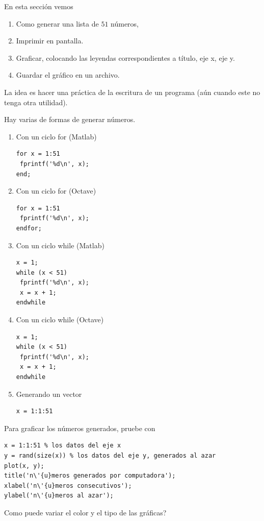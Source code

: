 En esta secci\'{o}n vemos 
\begin{enumerate}
\item Como generar una lista de $51$ n\'{u}meros,
\item Imprimir en pantalla.
\item Graficar, colocando las leyendas correspondientes a título, 
      eje x, eje y.
\item Guardar el gráfico en un archivo.
\end{enumerate}
La idea es hacer una pr\'{a}ctica de la escritura de un programa (a\'{u}n cuando este no tenga otra utilidad).

Hay varias de formas de generar n\'{u}meros.
\begin{enumerate}
\item Con un ciclo for (Matlab)
\begin{verbatim}
for x = 1:51
 fprintf('%d\n', x);
end;
\end{verbatim}

\item Con un ciclo for (Octave)
\begin{verbatim}
for x = 1:51
 fprintf('%d\n', x);
endfor;
\end{verbatim}

\item Con un ciclo while (Matlab)
\begin{verbatim}
x = 1;
while (x < 51)
 fprintf('%d\n', x);
 x = x + 1;
endwhile
\end{verbatim}

\item Con un ciclo while (Octave)
\begin{verbatim}
x = 1;
while (x < 51)
 fprintf('%d\n', x);
 x = x + 1;
endwhile
\end{verbatim}

\item Generando un vector
\begin{verbatim}
x = 1:1:51
\end{verbatim}
\end{enumerate}

Para graficar los n\'{u}meros generados, pruebe con
\begin{verbatim}
x = 1:1:51 % los datos del eje x
y = rand(size(x)) % los datos del eje y, generados al azar
plot(x, y); 
title('n\'{u}meros generados por computadora');
xlabel('n\'{u}meros consecutivos');
ylabel('n\'{u}meros al azar');
\end{verbatim}

\textquestiondown Como puede variar el color y el tipo de las gr\'{a}ficas?

